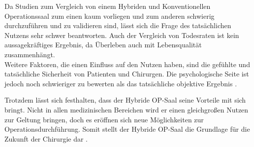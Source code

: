 Da Studien zum Vergleich von einem Hybriden und Konventionellen Operationssaal zum einen kaum vorliegen und zum anderen schwierig durchzuführen und zu validieren sind, lässt sich die Frage des tatsächlichen Nutzens sehr schwer beantworten. Auch der Vergleich von Todesraten ist kein aussagekräftiges Ergebnis, da Überleben auch mit Lebensqualität zusammenhängt\cite{HybriderVsKonventioneller}. \\
Weitere Faktoren, die einen Einfluss auf den Nutzen haben, sind die gefühlte und tatsächliche Sicherheit von Patienten und Chirurgen. Die psychologische Seite ist jedoch noch schwieriger zu bewerten als das tatsächliche objektive Ergebnis \cite{DerDigitaleOperationssaal}.

Trotzdem lässt sich festhalten, dass der Hybride OP-Saal seine Vorteile mit sich bringt. Nicht in allen medizinischen Bereichen wird er einen gleichgroßen Nutzen zur Geltung bringen, doch es eröffnen sich neue Möglichkeiten zur Operationsdurchführung. Somit stellt der Hybride OP-Saal die Grundlage für die Zukunft der Chirurgie dar \cite{ORofTheFuture}.





 





